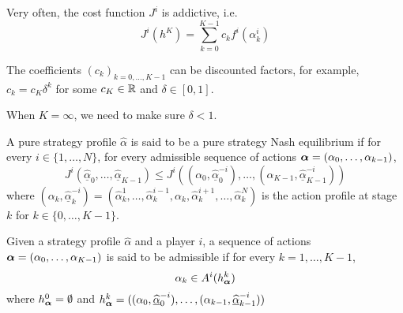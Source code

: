 Very often, the cost function $J^i$ is addictive, i.e.
$$
J^i(h^K) = \sum_{k=0}^{K-1} c_{k} f^i(\alpha^i_k)
$$  

The coefficients $(c_k)_{k=0,\ldots,K-1}$ can be discounted factors, for example, $c_k = c_K \delta^k$ for some $c_K \in \mathbb{R}$ and $\delta \in [0,1]$.

When $K=\infty$, we need to make sure $\delta < 1$.

\begin{definition}
	A pure strategy profile $\hat{\alpha}$ is said to be a pure strategy Nash equilibrium if for every $i\in \{1,\ldots, N\}$, for every admissible sequence of actions $\boldsymbol{\alpha} = (\alpha_0,\ldots,\alpha_{k-1}) $, 
	$$
		J^{i}(\underline{\hat{\alpha}}_0,\ldots, \underline{\hat{\alpha}}_{K-1} ) \leq J^i( (\alpha_0, \underline{\hat{\alpha}}_0^{-i}), \ldots, (\alpha_{K-1}, \underline{\hat{\alpha}}_{K-1}^{-i}) )
	$$
	where $(\alpha_k, \underline{\hat{\alpha}}_k^{-i}) = (\hat{\alpha}_k^1,\ldots, \hat{\alpha}_k^{i-1}, \alpha_k, \hat{\alpha}_{k}^{i+1}, \ldots, \hat{\alpha}_{k}^{N})$ is the action profile at stage $k$ for $k \in \{0,\ldots, K-1\}$.
\end{definition}

\begin{remark}
	Given a strategy profile $\hat{\alpha}$ and a player $i$, a sequence of actions $\boldsymbol{\alpha} = (\alpha_0, \ldots, \alpha_{K-1})$ is said to be admissible if for every $k=1, \ldots, K-1$,
	$$
		\alpha_{k} \in A^{i} (h^{k}_{\boldsymbol{\alpha}})
	$$
	where $h^0_{\boldsymbol{\alpha}} = \emptyset$ and $h^k_{\boldsymbol{\alpha}} = ( (\alpha_0, \underline{\widehat{\alpha}}_0^{-i}), \ldots, (\alpha_{k-1}, \underline{\widehat{\alpha}}_{k-1}^{-i}) )$ 
\end{remark}


